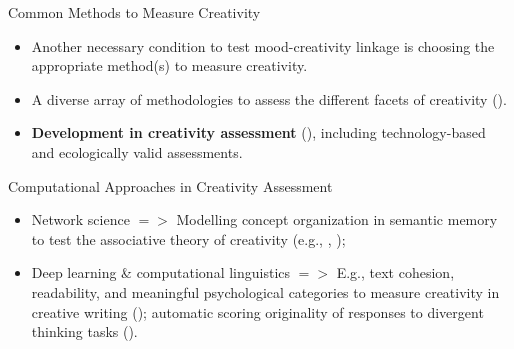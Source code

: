 \documentclass[pdf]{beamer}
\begin{document}

\begin{frame}{Common Methods to Measure Creativity}
\begin{itemize}
    \item<1-> Another necessary condition to test mood-creativity linkage is choosing the appropriate method(s) to measure creativity.
    \item<2-> A diverse array of methodologies to assess the different facets of creativity (\cite{de_alencar_theory_2021}).
    \item<3-> \textbf{Development in creativity assessment} (\cite{kaufman_cambridge_2010}), including technology-based and ecologically valid assessments.
\end{itemize}
\end{frame}

\begin{frame}{Computational Approaches in Creativity Assessment}
\begin{itemize}
    \item<1-> \alert{Network science} $=>$ Modelling concept organization in semantic memory to test the associative theory of creativity (e.g., \cite{kenett_investigating_2014}, \cite{beaty_automating_2021});
    \item<2-> \alert{Deep learning \& computational linguistics} $=>$ E.g., text cohesion, readability, and meaningful psychological categories to measure creativity in creative writing (\cite{zedelius_beyond_2019}); automatic scoring originality of responses to divergent thinking tasks (\cite{patterson_multilingual_2023}).
\end{itemize}
\end{frame}
\end{document}
